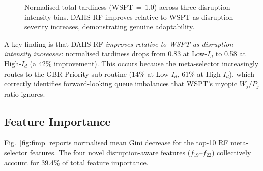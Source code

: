 \documentclass[3p,times]{elsarticle}
\begin{document}
\begin{figure}[htbp]
\centering
{}
\caption{Normalised total tardiness (WSPT$\,{=}\,1.0$) across three
  disruption-intensity bins.  DAHS-RF improves relative to WSPT as
  disruption severity increases, demonstrating genuine
  adaptability.}
\label{fig:disrupt}
\end{figure}

A key finding is that DAHS-RF \emph{improves relative to WSPT as
disruption intensity increases}: normalised tardiness drops from
0.83 at Low-$I_d$ to 0.58 at High-$I_d$ (a 42\% improvement).
This occurs because the meta-selector increasingly routes to the
GBR Priority sub-routine (14\% at Low-$I_d$, 61\% at High-$I_d$),
which correctly identifies forward-looking queue imbalances that
WSPT's myopic $W_j/P_j$ ratio ignores.

\subsection{Feature Importance}

Fig.~\ref{fig:fimp} reports normalised mean Gini decrease for the
top-10 RF meta-selector features.  The four novel disruption-aware
features ($f_{19}$--$f_{22}$) collectively account for 39.4\% of
total feature importance.
\end{document}
